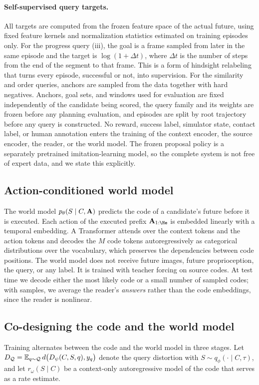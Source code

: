 \paragraph{Self-supervised query targets.}
All targets are computed from the frozen feature space of the actual future, using fixed feature kernels and normalization statistics estimated on training episodes only.
For the progress query (iii), the goal is a frame sampled from later in the same episode and the target is $\log(1+\Delta t)$, where $\Delta t$ is the number of steps from the end of the segment to that frame. This is a form of hindsight relabeling~\cite{andrychowicz2017her,hartikainen2020ddl} that turns every episode, successful or not, into supervision.
For the similarity and order queries, anchors are sampled from the data together with hard negatives.
Anchors, goal sets, and windows used for evaluation are fixed independently of the candidate being scored, the query family and its weights are frozen before any planning evaluation, and episodes are split by root trajectory before any query is constructed.
No reward, success label, simulator state, contact label, or human annotation enters the training of the context encoder, the source encoder, the reader, or the world model.
The frozen proposal policy is a separately pretrained imitation-learning model, so the complete system is not free of expert data, and we state this explicitly.

\subsection{Action-conditioned world model}
\label{sec:wm}
The world model $p_\theta(S\mid C,\mathbf{A})$ predicts the code of a candidate's future before it is executed.
Each action of the executed prefix $\bA_{1:\He}$ is embedded linearly with a temporal embedding.
A Transformer attends over the context tokens and the action tokens and decodes the $M$ code tokens autoregressively as categorical distributions over the vocabulary, which preserves the dependencies between code positions.
The world model does not receive future images, future proprioception, the query, or any label.
It is trained with teacher forcing on source codes.
At test time we decode either the most likely code or a small number of sampled codes; with samples, we average the reader's \emph{answers} rather than the code embeddings, since the reader is nonlinear.

\subsection{Co-designing the code and the world model}
\label{sec:codesign}
Training alternates between the code and the world model in three stages.
Let $D_{\mathcal{Q}}=\mathbb{E}_{q\sim\mathcal{Q}}\,d\big(D_\psi(C,S,q),y_q\big)$ denote the query distortion with $S\sim q_\phi(\cdot\mid C,\tau)$, and let $r_\omega(S\mid C)$ be a context-only autoregressive model of the code that serves as a rate estimate.

